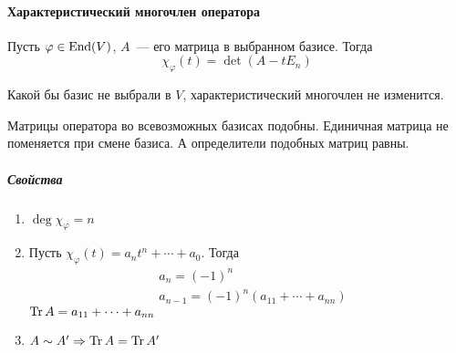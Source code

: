 \documentclass[12pt]{../../../notes}
\begin{document}
\paragraph{Характеристический многочлен оператора}
\begin{defn}\label{defn:linop::charpoly::charpoly}
  Пусть $\varphi\in \operatorname{End}(V)$, $A$~--- его матрица в выбранном базисе.
  Тогда
  \[
    \chi_\varphi(t) = \det (A - t E_n)
  \]
\end{defn}

\begin{stat}\label{stat:linop::charpoly::corr}
  Какой бы базис не выбрали в $V$, характеристический многочлен не изменится.
\end{stat}
\begin{itlproof}
  Матрицы оператора во всевозможных базисах подобны. Единичная матрица не поменяется при смене
  базиса. А определители подобных матриц равны.
\end{itlproof}

\subparagraph{Свойства}
\begin{enumerate}
  \item $\deg \chi_\varphi = n$
  \item Пусть $\chi_\varphi(t) = a_n t^n + \dotsb + a_0$. 
    Тогда
    \begin{align*}
      &a_n = (-1)^n \\
      &a_{n-1} = (-1)^n (a_{11} + \dotsb + a_{nn})
    \end{align*}
    {\label{defn:linop::charpoly::trace} $\operatorname{Tr} A = a_{11} + \dotsb + a_{nn}$ }
  \item $A \sim A' \Rightarrow \operatorname{Tr} A = \operatorname{Tr} A'$
\end{enumerate}
\end{document}
